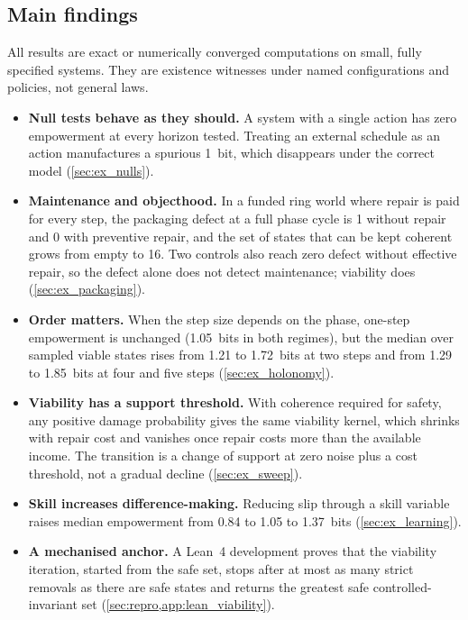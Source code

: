 \subsection{Main findings}
All results are exact or numerically converged computations on small, fully specified systems. They are existence witnesses under named configurations and policies, not general laws.
\begin{itemize}[leftmargin=*, itemsep=0.25em]
  \item \textbf{Null tests behave as they should.} A system with a single action has zero empowerment at every horizon tested. Treating an external schedule as an action manufactures a spurious 1~bit, which disappears under the correct model (\cref{sec:ex_nulls}).
  \item \textbf{Maintenance and objecthood.} In a funded ring world where repair is paid for every step, the packaging defect at a full phase cycle is 1 without repair and 0 with preventive repair, and the set of states that can be kept coherent grows from empty to 16. Two controls also reach zero defect without effective repair, so the defect alone does not detect maintenance; viability does (\cref{sec:ex_packaging}).
  \item \textbf{Order matters.} When the step size depends on the phase, one-step empowerment is unchanged (1.05~bits in both regimes), but the median over sampled viable states rises from 1.21 to 1.72~bits at two steps and from 1.29 to 1.85~bits at four and five steps (\cref{sec:ex_holonomy}).
  \item \textbf{Viability has a support threshold.} With coherence required for safety, any positive damage probability gives the same viability kernel, which shrinks with repair cost and vanishes once repair costs more than the available income. The transition is a change of support at zero noise plus a cost threshold, not a gradual decline (\cref{sec:ex_sweep}).
  \item \textbf{Skill increases difference-making.} Reducing slip through a skill variable raises median empowerment from 0.84 to 1.05 to 1.37~bits (\cref{sec:ex_learning}).
  \item \textbf{A mechanised anchor.} A Lean~4 development proves that the viability iteration, started from the safe set, stops after at most as many strict removals as there are safe states and returns the greatest safe controlled-invariant set (\cref{sec:repro,app:lean_viability}).
\end{itemize}

